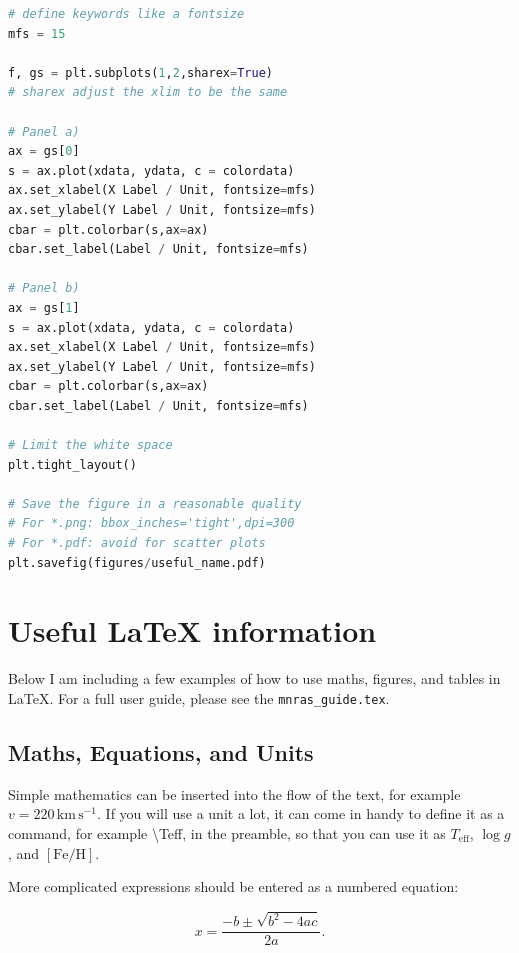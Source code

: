 \documentclass[fleqn,usenatbib]{mnras}
\newcommand{\Teff}{$T_\mathrm{eff}$\xspace}
\newcommand{\logg}{$\log g$\xspace}
\newcommand{\feh}{$\mathrm{[Fe/H]}$\xspace}
\begin{document}
\begin{lstlisting}[language=Python, caption=How to create a figure with 2 panels]
# define keywords like a fontsize
mfs = 15

f, gs = plt.subplots(1,2,sharex=True)
# sharex adjust the xlim to be the same

# Panel a)
ax = gs[0]
s = ax.plot(xdata, ydata, c = colordata)
ax.set_xlabel(X Label / Unit, fontsize=mfs)
ax.set_ylabel(Y Label / Unit, fontsize=mfs)
cbar = plt.colorbar(s,ax=ax)
cbar.set_label(Label / Unit, fontsize=mfs)

# Panel b)
ax = gs[1]
s = ax.plot(xdata, ydata, c = colordata)
ax.set_xlabel(X Label / Unit, fontsize=mfs)
ax.set_ylabel(Y Label / Unit, fontsize=mfs)
cbar = plt.colorbar(s,ax=ax)
cbar.set_label(Label / Unit, fontsize=mfs)

# Limit the white space
plt.tight_layout()

# Save the figure in a reasonable quality
# For *.png: bbox_inches='tight',dpi=300
# For *.pdf: avoid for scatter plots
plt.savefig(figures/useful_name.pdf)
\end{lstlisting}


\section{Useful LaTeX information} \label{sec:latex_information}

Below I am including a few examples of how to use maths, figures, and tables in \LaTeX. For a full user guide, please see the \texttt{mnras\_guide.tex}.

\subsection{Maths, Equations, and Units}
\label{sec:maths} %

Simple mathematics can be inserted into the flow of the text, for example $v=220\,\mathrm{km\,s^{-1}}$. If you will use a unit a lot, it can come in handy to define it as a command, for example \textbackslash Teff, in the preamble, so that you can use it as \Teff, \logg, and \feh.

More complicated expressions should be entered as a numbered equation:

\begin{equation}
    x=\frac{-b\pm\sqrt{b^2-4ac}}{2a}.
	\label{eq:quadratic}
\end{equation}
\end{document}

